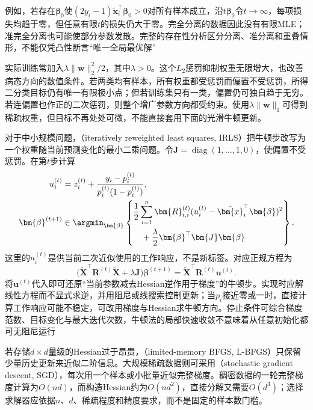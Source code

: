 例如，若存在$\bm{\beta}_0$使$(2y_i-1)\tilde{\bm{x}}_i^{\top}\bm{\beta}_0>0$对所有样本成立，沿$t\bm{\beta}_0$令$t\to\infty$，每项损失均趋于零，但任意有限$t$的损失仍大于零。完全分离的数据因此没有有限MLE；准完全分离也可能使部分参数发散。完整的存在性分析区分分离、准分离和重叠情形，不能仅凭凸性断言“唯一全局最优解”

实际训练常加入$\lambda\lVert\bm{w}\rVert_2^2/2$，其中$\lambda>0$。这个$L_2$惩罚抑制权重无限增大，也改善病态方向的数值条件。若两类均有样本，所有权重都受惩罚而偏置不受惩罚，所得二分类目标仍有唯一有限极小点；但若训练集只有一类，偏置仍可独自趋于无穷。若连偏置也作正的二次惩罚，则整个增广参数方向都受约束。使用$\lambda\lVert\bm{w}\rVert_1$可得到稀疏权重，但目标不再处处可微，不能直接套用下面的光滑牛顿更新。

对于中小规模问题，（iteratively reweighted least squares, IRLS）把牛顿步改写为一个权重随当前预测变化的最小二乘问题。令$\bm{J}=\operatorname{diag}(1,\ldots,1,0)$，使偏置不受惩罚。在第$t$步计算
\begin{equation}
  \label{eq:classification-logistic-irls}
  \begin{aligned}
    u_i^{(t)}
      &=z_i^{(t)}
        +\frac{y_i-p_i^{(t)}}{p_i^{(t)}(1-p_i^{(t)})},\\
    \bm{\beta}^{(t+1)}
      &\in\argmin_{\bm{\beta}}\left\{
        \begin{aligned}
          &\frac12\sum_{i=1}^{n}\bm{R}_{i,i}^{(t)}
            (u_i^{(t)}-\tilde{\bm{x}}_i^{\top}\bm{\beta})^2\\
          &\quad{}+\frac{\lambda}{2}
            \bm{\beta}^{\top}\bm{J}\bm{\beta}
        \end{aligned}
      \right\}.
  \end{aligned}
\end{equation}
这里的$u_i^{(t)}$是供当前二次近似使用的工作响应，不是新标签。对应正规方程为
\[
  \bigl(\tilde{\bm{X}}^{\top}\bm{R}^{(t)}\tilde{\bm{X}}
       +\lambda\bm{J}\bigr)\bm{\beta}^{(t+1)}
  =\tilde{\bm{X}}^{\top}\bm{R}^{(t)}\bm{u}^{(t)}.
\]
将$\bm{u}^{(t)}$代入即可还原“当前参数减去Hessian逆作用于梯度”的牛顿步。实现时应解线性方程而不显式求逆，并用阻尼或线搜索控制更新；当$p_i$接近零或一时，直接计算工作响应可能不稳定，可改用梯度与Hessian求牛顿方向。停止条件可综合梯度范数、目标变化与最大迭代次数，牛顿法的局部快速收敛不意味着从任意初始化都可无阻尼运行

若存储$d\times d$量级的Hessian过于昂贵，（limited-memory BFGS, L-BFGS）只保留少量历史更新来近似二阶信息。大规模稀疏数据则可采用（stochastic gradient descent, SGD），每次用一个样本或小批量近似完整梯度。稠密数据的一轮完整梯度计算为$O(nd)$，而构造Hessian约为$O(nd^2)$，直接分解又需要$O(d^3)$；选择求解器应依据$n$、$d$、稀疏程度和精度要求，而不是固定的样本数门槛。

